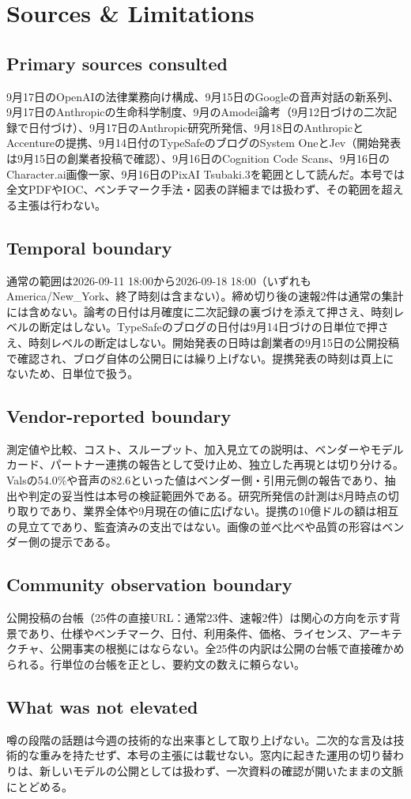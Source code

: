 \section*{Sources \& Limitations}

\subsection*{Primary sources consulted}
9月17日のOpenAIの法律業務向け構成、9月15日のGoogleの音声対話の新系列、9月17日のAnthropicの生命科学制度、9月のAmodei論考（9月12日づけの二次記録で日付づけ）、9月17日のAnthropic研究所発信、9月18日のAnthropicとAccentureの提携、9月14日付のTypeSafeのブログのSystem OneとJev（開始発表は9月15日の創業者投稿で確認）、9月16日のCognition Code Scans、9月16日のCharacter.ai画像一家、9月16日のPixAI Tsubaki.3を範囲として読んだ。本号では全文PDFやIOC、ベンチマーク手法・図表の詳細までは扱わず、その範囲を超える主張は行わない。

\subsection*{Temporal boundary}
通常の範囲は2026-09-11 18:00から2026-09-18 18:00（いずれもAmerica/New\_York、終了時刻は含まない）。締め切り後の速報2件は通常の集計には含めない。論考の日付は月確度に二次記録の裏づけを添えて押さえ、時刻レベルの断定はしない。TypeSafeのブログの日付は9月14日づけの日単位で押さえ、時刻レベルの断定はしない。開始発表の日時は創業者の9月15日の公開投稿で確認され、ブログ自体の公開日には繰り上げない。提携発表の時刻は頁上にないため、日単位で扱う。

\subsection*{Vendor-reported boundary}
測定値や比較、コスト、スループット、加入見立ての説明は、ベンダーやモデルカード、パートナー連携の報告として受け止め、独立した再現とは切り分ける。Valsの54.0\%や音声の82.6といった値はベンダー側・引用元側の報告であり、抽出や判定の妥当性は本号の検証範囲外である。研究所発信の計測は8月時点の切り取りであり、業界全体や9月現在の値に広げない。提携の10億ドルの額は相互の見立てであり、監査済みの支出ではない。画像の並べ比べや品質の形容はベンダー側の提示である。

\subsection*{Community observation boundary}
公開投稿の台帳（25件の直接URL：通常23件、速報2件）は関心の方向を示す背景であり、仕様やベンチマーク、日付、利用条件、価格、ライセンス、アーキテクチャ、公開事実の根拠にはならない。全25件の内訳は公開の台帳で直接確かめられる\cite{w38x-ledger-manifest}。行単位の台帳を正とし、要約文の数えに頼らない。

\subsection*{What was not elevated}
噂の段階の話題は今週の技術的な出来事として取り上げない。二次的な言及は技術的な重みを持たせず、本号の主張には載せない。窓内に起きた運用の切り替わりは、新しいモデルの公開としては扱わず、一次資料の確認が開いたままの文脈にとどめる。
